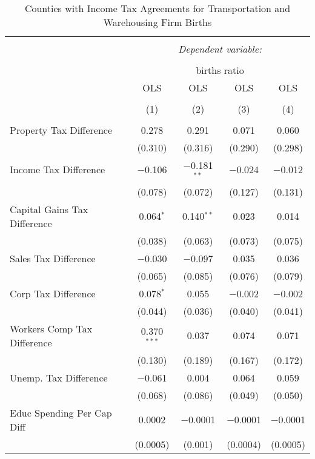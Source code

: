 
\begin{table}[!htbp] \centering 
  \caption{Counties with Income Tax Agreements for  Transportation and Warehousing Firm Births} 
  \label{48-49rd} 
\begin{tabular}{@{\extracolsep{5pt}}lcccc} 
\\[-1.8ex]\hline 
\hline \\[-1.8ex] 
 & \multicolumn{4}{c}{\textit{Dependent variable:}} \\ 
\cline{2-5} 
\\[-1.8ex] & \multicolumn{4}{c}{births ratio} \\ 
 & OLS & OLS & OLS & OLS \\ 
\\[-1.8ex] & (1) & (2) & (3) & (4)\\ 
\hline \\[-1.8ex] 
 Property Tax Difference & 0.278 & 0.291 & 0.071 & 0.060 \\ 
  & (0.310) & (0.316) & (0.290) & (0.298) \\ 
  Income Tax Difference & $-$0.106 & $-$0.181$^{**}$ & $-$0.024 & $-$0.012 \\ 
  & (0.078) & (0.072) & (0.127) & (0.131) \\ 
  Capital Gains Tax Difference & 0.064$^{*}$ & 0.140$^{**}$ & 0.023 & 0.014 \\ 
  & (0.038) & (0.063) & (0.073) & (0.075) \\ 
  Sales Tax Difference & $-$0.030 & $-$0.097 & 0.035 & 0.036 \\ 
  & (0.065) & (0.085) & (0.076) & (0.079) \\ 
  Corp Tax Difference & 0.078$^{*}$ & 0.055 & $-$0.002 & $-$0.002 \\ 
  & (0.044) & (0.036) & (0.040) & (0.041) \\ 
  Workers Comp Tax Difference & 0.370$^{***}$ & 0.037 & 0.074 & 0.071 \\ 
  & (0.130) & (0.189) & (0.167) & (0.172) \\ 
  Unemp. Tax Difference & $-$0.061 & 0.004 & 0.064 & 0.059 \\ 
  & (0.068) & (0.086) & (0.049) & (0.050) \\ 
  Educ Spending Per Cap Diff & 0.0002 & $-$0.0001 & $-$0.0001 & $-$0.0001 \\ 
  & (0.0005) & (0.001) & (0.0004) & (0.0005) \\ 

\end{tabular}
\end{table}
